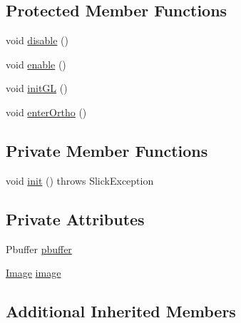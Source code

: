 \subsection*{Protected Member Functions}
\begin{DoxyCompactItemize}
\item 
void \mbox{\hyperlink{classorg_1_1newdawn_1_1slick_1_1opengl_1_1pbuffer_1_1_p_buffer_unique_graphics_a7fe912206a79e564fb1e4cf1b067ac55}{disable}} ()
\item 
void \mbox{\hyperlink{classorg_1_1newdawn_1_1slick_1_1opengl_1_1pbuffer_1_1_p_buffer_unique_graphics_a7aa1fcde7766aaef6c02992cfc9c4955}{enable}} ()
\item 
void \mbox{\hyperlink{classorg_1_1newdawn_1_1slick_1_1opengl_1_1pbuffer_1_1_p_buffer_unique_graphics_ac96d393e734949dafa1894e2b5e329e8}{init\+GL}} ()
\item 
void \mbox{\hyperlink{classorg_1_1newdawn_1_1slick_1_1opengl_1_1pbuffer_1_1_p_buffer_unique_graphics_a3331dd0ca3d82959b02bdfe4be9a274b}{enter\+Ortho}} ()
\end{DoxyCompactItemize}
\subsection*{Private Member Functions}
\begin{DoxyCompactItemize}
\item 
void \mbox{\hyperlink{classorg_1_1newdawn_1_1slick_1_1opengl_1_1pbuffer_1_1_p_buffer_unique_graphics_ad2c4549df1e2d1bb805ab1968000cbe6}{init}} ()  throws Slick\+Exception 
\end{DoxyCompactItemize}
\subsection*{Private Attributes}
\begin{DoxyCompactItemize}
\item 
Pbuffer \mbox{\hyperlink{classorg_1_1newdawn_1_1slick_1_1opengl_1_1pbuffer_1_1_p_buffer_unique_graphics_a22fa7421a781dae3d7c504fc0eb10315}{pbuffer}}
\item 
\mbox{\hyperlink{classorg_1_1newdawn_1_1slick_1_1_image}{Image}} \mbox{\hyperlink{classorg_1_1newdawn_1_1slick_1_1opengl_1_1pbuffer_1_1_p_buffer_unique_graphics_abc5d45be7087d1aeb486c2fae5c194ca}{image}}
\end{DoxyCompactItemize}
\subsection*{Additional Inherited Members}


